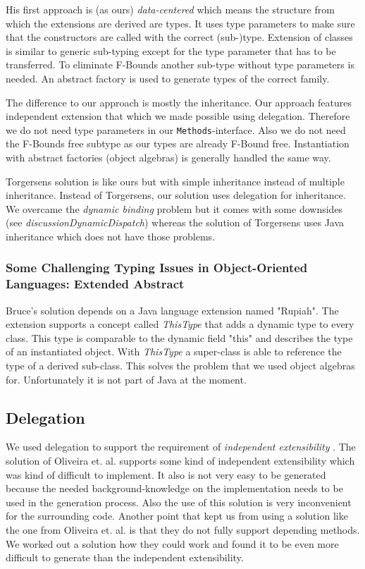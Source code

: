 \documentclass{report}
\begin{document}
His first approach is (as ours) \emph{data-centered} which means the structure from which the extensions are derived are types. It uses type parameters to make sure that the constructors are called with the correct (sub-)type. Extension of classes is similar to generic sub-typing except for the type parameter that has to be transferred. To eliminate F-Bounds another sub-type without type parameters is needed. An abstract factory is used to generate types of the correct family.

The difference to our approach is mostly the inheritance. Our approach features independent extension that which we made possible using delegation. Therefore we do not need type parameters in our \lstinline{Methods}-interface. Also we do not need the F-Bounds free subtype as our types are already F-Bound free. Instantiation with abstract factories (object algebras) is generally handled the same way.

Torgersens solution is like ours but with simple inheritance instead of multiple inheritance.
Instead of Torgersens, our solution uses delegation for inheritance. We overcame the \emph{dynamic binding} problem but it comes with some downsides (see \emph{discussionDynamicDispatch}) whereas the solution of Torgersens uses Java inheritance which does not have those problems.

\subsubsection*{Some Challenging Typing Issues in Object-Oriented Languages: Extended Abstract\cite{Bruce-Typing-2003}}

Bruce's solution depends on a Java language extension named "Rupiah"\cite{Foster-Rupiah-2001}. The extension supports a concept called \emph{ThisType} that adds a dynamic type to every class. This type is comparable to the dynamic field "this" and describes the type of an instantiated object. With \emph{ThisType} a super-class is able to reference the type of a derived sub-class. This solves the problem that we used object algebras for. Unfortunately it is not part of Java at the moment.

\subsection{Delegation}
We used delegation to support the requirement of \emph{independent extensibility} \cite{Odersky-Expression-2005, Oliv-Extensibility-2012}. The solution of Oliveira et. al. supports some kind of independent extensibility which was kind of difficult to implement. It also is not very easy to be generated because the needed background-knowledge on the implementation needs to be used in the generation process. Also the use of this solution is very inconvenient for the surrounding code. Another point that kept us from using a solution like the one from Oliveira et. al. is that they do not fully support depending methods. We worked out a solution how they could work and found it to be even more difficult to generate than the independent extensibility.
\end{document}
